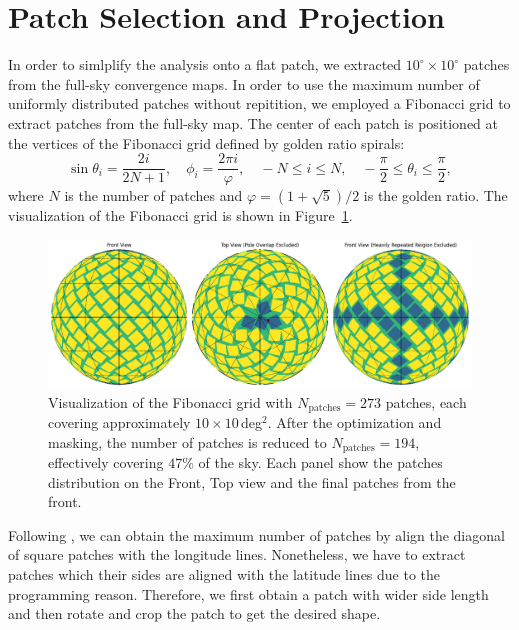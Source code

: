 \section{Patch Selection and Projection} \label{sec:patch_selection}
In order to simlplify the analysis onto a flat patch, we extracted $10^\circ \times 10^\circ$ patches from the full-sky convergence maps. In order to use the maximum number of uniformly distributed patches without repitition, we employed a Fibonacci grid \citep{2006QJRMS.132.1769S, 2023MNRAS.524.5591F} to extract patches from the full-sky map. The center of each patch is positioned at the vertices of the Fibonacci grid defined by golden ratio spirals:
\begin{equation}
    \sin \theta_i = \frac{2i}{2N + 1}, \quad \phi_i = \frac{2 \pi i}{\varphi}, \quad -N \leq i \leq N, \quad -\frac{\pi}{2} \leq \theta_i \leq \frac{\pi}{2},
\end{equation}
where $N$ is the number of patches and $\varphi = (1 + \sqrt{5})/2$ is the golden ratio. The visualization of the Fibonacci grid is shown in Figure~\ref{fig:fibonacci}.
\begin{figure}[ht]
    \centering
    \includegraphics[width=\textwidth]{figures/fibonacci_grid.png}
    \caption[Visualization of the Fibonacci grids]{Visualization of the Fibonacci grid with $N_{\text{patches}} = 273$ patches, each covering approximately $10 \times 10$\,deg$^2$. 
    After the optimization and masking, the number of patches is reduced to $N_{\text{patches}} = 194$, effectively covering $47 \%$ of the sky.
    Each panel show the patches distribution on the Front, Top view and the final patches from the front.}\label{fig:fibonacci}
\end{figure}
Following \citet{2023MNRAS.524.5591F}, we can obtain the maximum number of patches by align the diagonal of square patches with the longitude lines. Nonetheless, we have to extract patches which their sides are aligned with the latitude lines due to the programming reason. Therefore, we first obtain a patch with wider side length and then rotate and crop the patch to get the desired shape.

